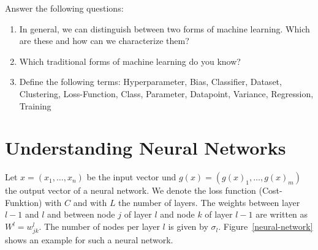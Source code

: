 Answer the following questions:
\begin{enumerate}
    \item In general, we can distinguish between two forms of machine learning.
    Which are these and how can we characterize them?
    \item Which traditional forms of machine learning do you know?
    \item Define the following terms:
    Hyperparameter, Bias, Classifier, Dataset, Clustering, Loss-Function, Class, Parameter, Datapoint, Variance, Regression, Training
\end{enumerate}
%
%
\section*{Understanding Neural Networks}
Let $x=(x_1,\dots,x_n)$ be the input vector und $g(x)=(g(x)_1,\dots,g(x)_m)$ the output vector of a neural network.
We denote the loss function (Cost-Funktion) with $C$ and with $L$ the number of layers.
The weights between layer $l-1$ and $l$ and between node $j$ of layer $l$ and node $k$ of layer $l-1$ are written as $W^l=w^l_{jk}$.
The number of nodes per layer $l$ is given by $\sigma_l$.
Figure~\ref{neural-network} shows an example for such a neural network.
